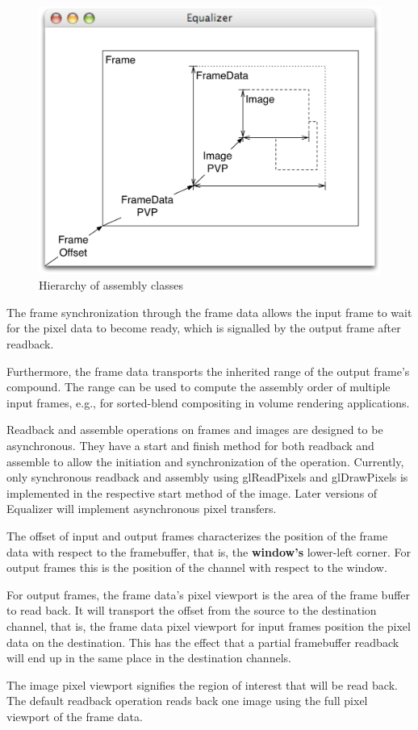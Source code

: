 \documentclass[10pt,a4]{scrartcl}
\begin{document}
\begin{figure}
  \includegraphics[width=.618\textwidth]{images/assembly.pdf}
  {\caption{\small\label{fAssembly}Hierarchy of assembly classes}}
\end{figure}
The frame synchronization through the frame data allows the input frame
to wait for the pixel data to become ready, which is signalled by the
output frame after readback.

Furthermore, the frame data transports the inherited range of the output
frame's compound. The range can be used to compute the assembly order of
multiple input frames, e.g., for sorted-blend compositing in volume
rendering applications.

Readback and assemble operations on frames and images are designed to be
asynchronous. They have a start and finish method for both readback and
assemble to allow the initiation and synchronization of the operation.
Currently, only synchronous readback and assembly using
\textsf{glReadPixels} and \textsf{glDrawPixels} is implemented in the
respective start method of the image. Later versions of Equalizer will
implement asynchronous pixel transfers.

The offset of input and output frames characterizes the position of the
frame data with respect to the framebuffer, that is, the
\textbf{window's} lower-left corner. For output frames this is the
position of the channel with respect to the window.

For output frames, the frame data's pixel viewport is the area of the
frame buffer to read back. It will transport the offset from the source
to the destination channel, that is, the frame data pixel viewport for
input frames position the pixel data on the destination. This has the
effect that a partial framebuffer readback will end up in the same place
in the destination channels.

The image pixel viewport signifies the region of interest that will be read
back. The default readback operation reads back one image using the full
pixel viewport of the frame data.
\end{document}
